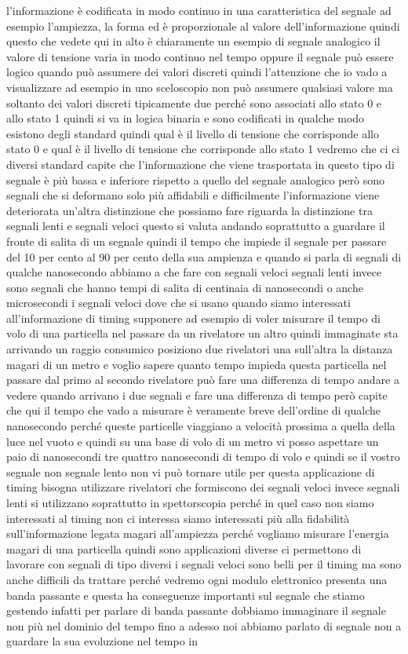 l'informazione è codificata in modo continuo in una caratteristica del segnale ad esempio l'ampiezza, la forma ed è proporzionale al valore dell'informazione quindi questo che vedete qui in alto è chiaramente un esempio di segnale analogico il valore di tensione varia in modo continuo nel tempo oppure il segnale può essere logico quando può assumere dei valori discreti quindi l'attenzione che io vado a visualizzare ad esempio in uno sceloscopio non può assumere qualsiasi valore ma soltanto dei valori discreti tipicamente due perché sono associati allo stato 0 e allo stato 1 quindi si va in logica binaria e sono codificati in qualche modo esistono degli standard quindi qual è il livello di tensione che corrisponde allo stato 0 e qual è il livello di tensione che corrisponde allo stato 1 vedremo che ci ci diversi standard capite che l'informazione che viene trasportata in questo tipo di segnale è più bassa e inferiore rispetto a quello del segnale analogico però sono segnali che si deformano solo più affidabili e difficilmente l'informazione viene deteriorata un'altra distinzione che possiamo fare riguarda la distinzione tra segnali lenti e segnali veloci questo si valuta andando soprattutto a guardare il fronte di salita di un segnale quindi il tempo che impiede il segnale per passare del 10 per cento al 90 per cento della sua ampienza e quando si parla di segnali di qualche nanosecondo abbiamo a che fare con segnali veloci segnali lenti invece sono segnali che hanno tempi di salita di centinaia di nanosecondi o anche microsecondi i segnali veloci dove che si usano quando siamo interessati all'informazione di timing supponere ad esempio di voler misurare il tempo di volo di una particella nel passare da un rivelatore un altro quindi immaginate sta arrivando un raggio consumico posiziono due rivelatori una sull'altra la distanza magari di un metro e voglio sapere quanto tempo impieda questa particella nel passare dal primo al secondo rivelatore può fare una differenza di tempo andare a vedere quando arrivano i due segnali e fare una differenza di tempo però capite che qui il tempo che vado a misurare è veramente breve dell'ordine di qualche nanosecondo perché queste particelle viaggiano a velocità prossima a quella della luce nel vuoto e quindi su una base di volo di un metro vi posso aspettare un paio di nanosecondi tre quattro nanosecondi di tempo di volo e quindi se il vostro segnale non segnale lento non vi può tornare utile per questa applicazione di timing bisogna utilizzare rivelatori che formiscono dei segnali veloci invece segnali lenti si utilizzano soprattutto in spettorscopia perché in quel caso non siamo interessati al timing non ci interessa siamo interessati più alla fidabilità sull'informazione legata magari all'ampiezza perché vogliamo misurare l'energia magari di una particella quindi sono applicazioni diverse ci permettono di lavorare con segnali di tipo diversi i segnali veloci sono belli per il timing ma sono anche difficili da trattare perché vedremo ogni modulo elettronico presenta una banda passante e questa ha conseguenze importanti sul segnale che stiamo gestendo infatti per parlare di banda passante dobbiamo immaginare il segnale non più nel dominio del tempo fino a adesso noi abbiamo parlato di segnale non a guardare la sua evoluzione nel tempo in 